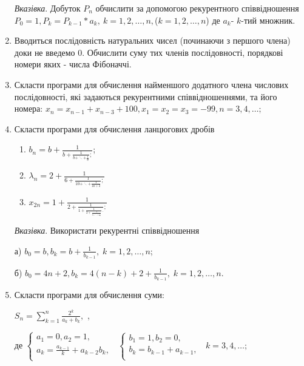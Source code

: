 \documentclass[]{article}
\makeatletter
\newcommand{\xslalph}[1]{\expandafter\@xslalph\csname c@#1\endcsname}
\newcommand{\@xslalph}[1]{%
    \ifcase#1\or а\or б\or в\or г\or д\or e\or є\or ж\or з\or i%
    \or й\or к\or л\or м\or н\or о\or п\or р\or с\or т%
    \or у\or ф\or х\or ц\or ч\or ш\or ю\or я\or аа\or бб\or вв %
    \else\@ctrerr\fi%
}
\makeatother
\begin{document}
\begin{enumerate}
\emph{\emph{Вказівка}}. Добуток $P_{n}$ обчислити за
допомогою рекурентного співвідношення
\(P_{0} = 1,P_{k} = P_{k - 1}*a_{k},\ k = 1,2,\ldots,n,\)($k=1,2,\ldots,n$)
де \(a_{k}\)- $k$-тий множник.

\item
Вводиться послідовність натуральних чисел (починаючи з першого члена)
доки не введемо 0. Обчислити суму тих членів послідовності, порядкові
номери яких - числа Фібоначчі.

\item
  Скласти програми для обчислення найменшого додатного члена числових
  послідовності, які задаються рекурентними співвідношеннями, та його
  номера:
\(x_{n} = x_{n - 1} + x_{n - 3} + 100, x_{1} = x_{2} = x_{3} = - 99, n = 3,4,\ldots;\)

\item
  Скласти програми для обчислення ланцюгових дробів
\begin{enumerate}[label=\xslalph*)]
\item \(b_{n} = b + \frac{1}{b + \frac{1}{b + \ddots + \frac{1}{b}};}\); 
\item
\(\lambda_{n} = 2 + \frac{1}{6 + \frac{1}{10 + \ddots + \frac{1}{4n + 2}};}\)
\item
\(x_{2n} = 1 + \frac{1}{2 + \frac{1}{1 + \frac{1}{2 + \frac{1}{1 + \ddots + \frac{1}{2}}}.};}\)
\end{enumerate}
\emph{\emph{Вказівка}}. Використати рекурентні співвідношення

а)
\(b_{0} = b,b_{k} = b + \frac{1}{b_{k - 1}}, \; k = 1,2,\ldots,n\);

б)
\(b_{0} = 4n + 2,b_{k} = 4(n - k) + 2 + \frac{1}{b_{k - 1}},\; k = 1,2,\ldots,n\).

\item
  Скласти програми для обчислення суми:


\(S_{n} = \sum\limits_{k = 1}^{n}\frac{2^{k}}{a_{k} + b_{k}},\) ,

де \(\left\{ \begin{matrix}
 a_{1} = 0,a_{2} = 1, \\
 a_{k} = \frac{a_{k - 1}}{k} + a_{k - 2}b_{k}, \\
\end{matrix} \right.\ \) \(\left\{ \begin{matrix}
 b_{1} = 1,b_{2} = 0, \\
 b_{k} = b_{k - 1} + a_{k - 1}, \\
\end{matrix} \right.\ \) \(k = 3,4,\ldots;\)



\end{enumerate}
\end{document}
